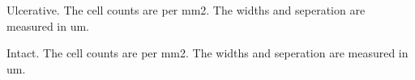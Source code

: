 \documentclass{article}
\newcommand{\pwd}{D:/DeepLearning/images_from_K/lesion_normal_comparison/}
\begin{document}
%
%
%
%
\begin{center}
\begin{table}[h] \centering



\caption{Ulcerative.
The cell counts are per mm2. The widths and seperation are measured in um.}
\vspace{-5pt} 
\label{tab ulcerative}

\end{table}
\end{center}%

%
%
%
%
\begin{center}
\begin{table}[h] \centering



\caption{Intact.
The cell counts are per mm2. The widths and seperation are measured in um.}
\vspace{-5pt} 
\label{tab intact}

\end{table}
\end{center}%

\clearpage%
\end{document}
